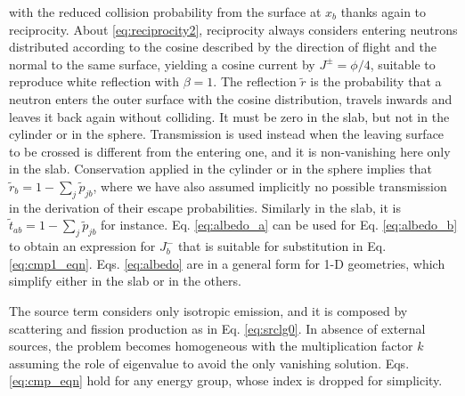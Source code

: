 \documentclass{ictt26}
\begin{document}
with the reduced collision probability from the surface at $x_b$ thanks again to reciprocity. About \ref{eq:reciprocity2}, reciprocity always considers entering neutrons distributed according to the cosine described by the direction of flight and the normal to the same surface, yielding a cosine current by $J^\pm = \phi/4$, suitable to reproduce white reflection with $\beta = 1$. %
The reflection $\tilde{r}$ is the probability that a neutron enters the outer surface with the cosine distribution, travels inwards and leaves it back again without colliding. It must be zero in the slab, but not in the cylinder or in the sphere. Transmission is used instead when the leaving surface to be crossed is different from the entering one, and it is non-vanishing here only in the slab. Conservation applied in the cylinder or in the sphere implies that $\tilde{r}_b = 1 - \sum_j{\tilde{p}_{jb}}$, where we have also assumed implicitly no possible transmission in the derivation of their escape probabilities. Similarly in the slab, it is $\tilde{t}_{ab} = 1 - \sum_j{\tilde{p}_{jb}}$ for instance. Eq. \ref{eq:albedo_a} can be used for Eq. \ref{eq:albedo_b} to obtain an expression for $J_b^-$ that is suitable for substitution in Eq. \ref{eq:cmp1_eqn}. Eqs. \ref{eq:albedo} are in a general form for 1-D geometries, which simplify either in the slab or in the others.

The source term considers only isotropic emission, and it is composed by scattering and fission production as in Eq. \ref{eq:srclg0}. In absence of external sources, the problem becomes homogeneous with the multiplication factor $k$ assuming the role of eigenvalue to avoid the only vanishing solution. Eqs. \ref{eq:cmp_eqn} hold for any energy group, whose index is dropped for simplicity.
\end{document}
